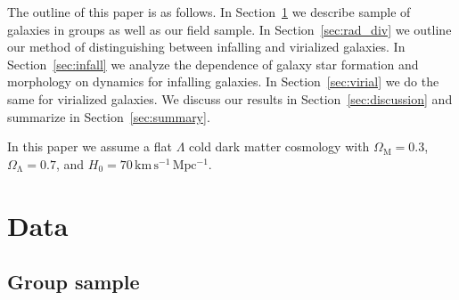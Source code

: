\documentclass[a4paper,fleqn,usenatbib]{mnras}
\begin{document}
\par
The outline of this paper is as follows.  In Section~\ref{sec:data} we
describe sample of galaxies in groups as well as our field sample.  In
Section~\ref{sec:rad_div} we outline our method of distinguishing
between infalling and virialized galaxies.  In
Section~\ref{sec:infall} we analyze the dependence of galaxy star
formation and morphology on dynamics for infalling galaxies.  In
Section~\ref{sec:virial} we do the same for virialized galaxies.  We
discuss our results in Section~\ref{sec:discussion} and summarize in
Section~\ref{sec:summary}.
\par
In this paper we assume a flat $\Lambda$ cold dark matter cosmology
with $\Omega_\mathrm{M} = 0.3$, $\Omega_\mathrm{\Lambda} = 0.7$, and
$H_0 = 70\,\mathrm{km}\,\mathrm{s^{-1}}\,\mathrm{Mpc^{-1}}$.


\section{Data}
\label{sec:data}

\subsection{Group sample}
\end{document}
